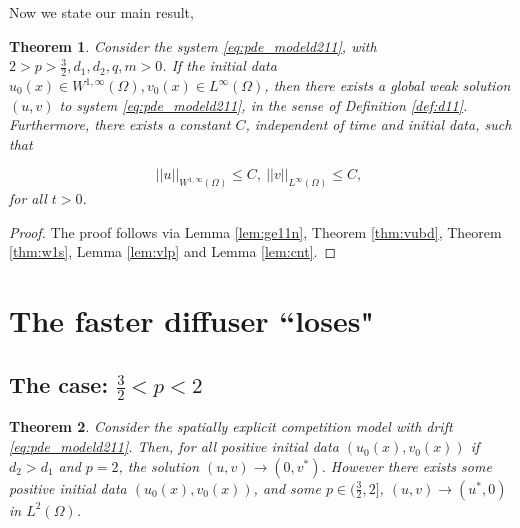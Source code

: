 \documentclass[10pt]{amsart}
\theoremstyle{plain}
\newtheorem{theorem}{Theorem}[section]
\theoremstyle{definition}
\begin{document}
Now we state our main result,

\begin{theorem}
\label{thm:mt1}
Consider the system \eqref{eq:pde_modeld211}, with $2>p>\frac{3}{2}, d_{1}, d_{2}, q,m>0$. If the initial data $u_{0}(x) \in W^{1,\infty}(\Omega), v_{0}(x) \in L^{\infty}(\Omega)$, then there exists a global weak solution $(u,v)$ to system \eqref{eq:pde_modeld211}, in the sense of Definition \ref{def:d11}. Furthermore, there exists a constant $C$, independent of time and initial data, such that

\begin{equation}
   ||u||_{W^{1,\infty}(\Omega)} \leq C, \ ||v||_{L^{\infty}(\Omega)} \leq C, \
  \end{equation}
  for all $t > 0$.
\end{theorem}

\begin{proof}
The proof follows via Lemma \ref{lem:ge11n}, Theorem \ref{thm:vubd}, Theorem \ref{thm:w1s}, Lemma \ref{lem:vlp} and Lemma \ref{lem:cnt}.
\end{proof}







\section{The faster diffuser ``loses"}






\subsection{The case: $\frac{3}{2} < p <2$}


\begin{theorem}
\label{thm:FFTEdd}
Consider the spatially explicit competition model with drift \eqref{eq:pde_modeld211}.  Then, for all positive initial data $(u_0(x),v_0(x))$ if $d_2> d_1$ and $p=2$, the solution $(u,v) \to (0,v^{*})$. However there exists some positive initial data $(u_0(x),v_0(x))$, and some $p \in(\frac{3}{2},2]$,  $ (u,v) \to (u^{*},0)$ in $L^{2}(\Omega)$.
\end{theorem}
\end{document}
